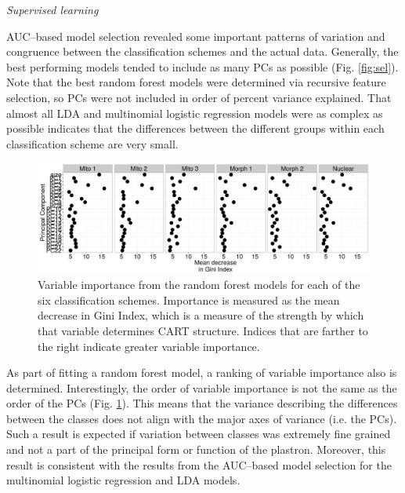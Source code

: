\documentclass[12pt,letterpaper]{article}
\renewcommand{\subsection}[1]{%
\bigskip
\begin{center}
\begin{large}
\normalfont\itshape #1
\end{large}
\end{center}}
\begin{document}
\subsection{Supervised learning}
AUC--based model selection revealed some important patterns of variation and congruence between the classification schemes and the actual data. Generally, the best performing models tended to include as many PCs as possible (Fig. \ref{fig:sel}). Note that the best random forest models were determined via recursive feature selection, so PCs were not included in order of percent variance explained. That almost all LDA and multinomial logistic regression models were as complex as possible indicates that the differences between the different groups within each classification scheme are very small.

\begin{figure}[h]
  \centering
  \includegraphics[height = 0.5\textheight, width = \textwidth, keepaspectratio = true]{figure/var_imp}
  \caption{Variable importance from the random forest models for each of the six classification schemes. Importance is measured as the mean decrease in Gini Index, which is a measure of the strength by which that variable determines CART structure. Indices that are farther to the right indicate greater variable importance.}
  \label{fig:var_imp}
\end{figure}

As part of fitting a random forest model, a ranking of variable importance also is determined. Interestingly, the order of variable importance is not the same as the order of the PCs (Fig. \ref{fig:var_imp}). This means that the variance describing the differences between the classes does not align with the major axes of variance (i.e. the PCs). Such a result is expected if variation between classes was extremely fine grained and not a part of the principal form or function of the plastron. Moreover, this result is consistent with the results from the AUC--based model selection for the multinomial logistic regression and LDA models.
\end{document}
